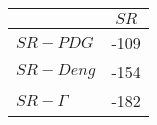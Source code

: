 \begin{tabular}{l|c}
\toprule
{} &  $SR$ \\
\midrule
\textbf{$SR-PDG$   } &  -109 \\
\textbf{$SR-Deng$  } &  -154 \\
\textbf{$SR-\Gamma$} &  -182 \\
\bottomrule
\end{tabular}

